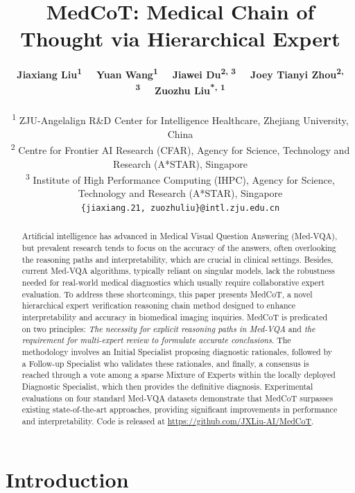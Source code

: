 \documentclass[11pt]{article}
\title{
MedCoT: Medical Chain of Thought via Hierarchical Expert 
}
\author{
 \textbf{Jiaxiang Liu\textsuperscript{1}}\ \ \
 \textbf{Yuan Wang\textsuperscript{1}}\ \ \
 \textbf{Jiawei Du\textsuperscript{2, 3}}\ \ \
 \textbf{Joey Tianyi Zhou\textsuperscript{2, 3}}\ \ \
 \textbf{Zuozhu Liu\textsuperscript{*, 1}}
\\
\\
 \textsuperscript{1} \small ZJU-Angelalign R\&D Center for Intelligence Healthcare, Zhejiang University, China\\
 \textsuperscript{2} \small Centre for Frontier AI Research (CFAR), Agency for Science, Technology and Research (A*STAR), Singapore
\\
 \textsuperscript{3} \small Institute of High Performance Computing (IHPC), Agency for Science, Technology and Research (A*STAR), Singapore
\\
 { \small
   {\tt \{jiaxiang.21, zuozhuliu\}@intl.zju.edu.cn}
 }
}
\begin{document}
\maketitle

\begin{abstract}
Artificial intelligence has advanced in Medical Visual Question Answering (Med-VQA), but prevalent research tends to focus on the accuracy of the answers, often overlooking the reasoning paths and interpretability, which are crucial in clinical settings. Besides, current Med-VQA algorithms, typically reliant on singular models, lack the robustness needed for real-world medical diagnostics which usually require collaborative expert evaluation.
To address these shortcomings, this paper presents MedCoT, a novel hierarchical expert verification reasoning chain method designed to enhance interpretability and accuracy in biomedical imaging inquiries. MedCoT is predicated on two principles: \textit{The necessity for explicit reasoning paths in Med-VQA} and \textit{the requirement for multi-expert review to formulate accurate conclusions}. The methodology involves an Initial Specialist proposing diagnostic rationales, followed by a Follow-up Specialist who validates these rationales, and finally, a consensus is reached through a vote among a sparse Mixture of Experts within the locally deployed Diagnostic Specialist, which then provides the definitive diagnosis.
Experimental evaluations on four standard Med-VQA datasets demonstrate that MedCoT surpasses existing state-of-the-art approaches, providing significant improvements in performance and interpretability. 
Code is released at \url{https://github.com/JXLiu-AI/MedCoT}.
\let\thefootnote\relax\footnotetext{* Corresponding author.}
\end{abstract}

\section{Introduction}
\end{document}
